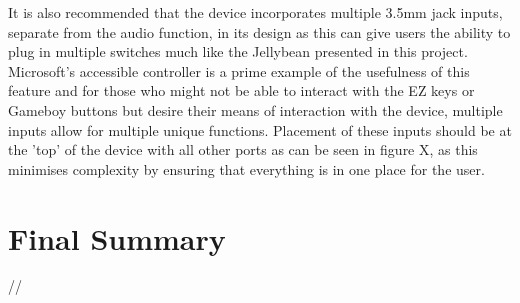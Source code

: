It is also recommended that the device incorporates multiple 3.5mm jack inputs, separate from the audio function, in its design as this can give users the ability to plug in multiple switches much like the Jellybean presented in this project.
Microsoft's accessible controller \cite{adaptive} is a prime example of the usefulness of this feature and for those who might not be able to interact with the EZ keys or Gameboy buttons but desire their means of interaction with the device, multiple inputs allow for multiple unique functions.
Placement of these inputs should be at the 'top' of the device with all other ports as can be seen in figure X, as this minimises complexity by ensuring that everything is in one place for the user.


\section{Final Summary}
//